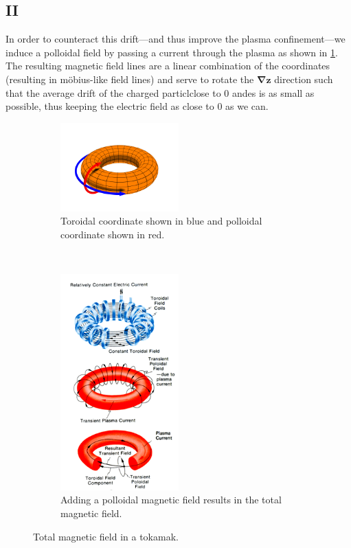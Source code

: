 \documentclass[10pt,a4paper]{article}
\begin{document}
		\subsection{II}
		In order to counteract this drift---and thus improve the plasma confinement---we induce a polloidal field by passing a current through the plasma as shown in \cref{f:totalb}. The resulting magnetic field lines are a linear combination of the coordinates (resulting in m\"{o}bius-like field lines) and serve to rotate the $\bm{\nabla z}$ direction such that the average drift of the charged particlclose to $0$ andes is as small as possible, thus keeping the electric field as close to $0$ as we can.
		\begin{figure}
			\centering
			\begin{subfigure}[b]{0.45\textwidth}
				\centering
				\includegraphics[width=0.5\textwidth]{toroidal_coord.png}
				\caption{Toroidal coordinate shown in blue and polloidal coordinate shown in red.}
			\end{subfigure}
			~
			\begin{subfigure}[b]{0.45\textwidth}
				\centering
				\includegraphics[width=0.5\textwidth]{tokamak_field.png}
				\caption{Adding a polloidal magnetic field results in the total magnetic field.}
			\end{subfigure}
			\caption{Total magnetic field in a tokamak.}
			\label{f:totalb}
		\end{figure}
		
\end{document}

